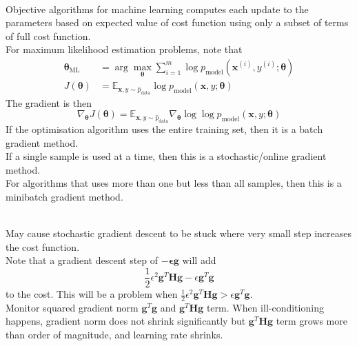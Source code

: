 \begin{remark} \\
Objective algorithms for machine learning computes each update to the parameters based on expected value of cost function using only a subset of terms of full cost function.\\
For maximum likelihood estimation problems, note that
\begin{align}
\bm{\theta}_{\text{ML}} &= \arg \max_{\bm{\theta}} \sum\limits_{i=1}^m \log p_{\text{model}}(\bm{x}^{(i)}, y^{(i)}; \bm{\theta}) \nonumber \\
J(\bm{\theta}) &= \mathbb{E}_{\bm{x}, y \sim \hat{p}_{\text{data}}} \log p_{\text{model}} (\bm{x}, y; \bm{\theta}) \nonumber
\end{align}
The gradient is then
\begin{equation}
\nabla_{\bm{\theta}} J(\bm{\theta}) = \mathbb{E}_{\bm{x}, y \sim \hat{p}_{\text{data}}} \nabla_{\bm{\theta}} \log \log p_{\text{model}} (\bm{x}, y; \bm{\theta}) \nonumber
\end{equation}
If the optimisation algorithm uses the entire training set, then it is a batch gradient method.\\
If a single sample is used at a time, then this is a stochastic/online gradient method.\\
For algorithms that uses more than one but less than all samples, then this is a minibatch gradient method.
\end{remark}

\begin{remark} \\
May cause stochastic gradient descent to be stuck where very small step increases the cost function.\\
Note that a gradient descent step of $- \bm{\epsilon} \bm{g}$ will add
\begin{equation}
\frac{1}{2} \epsilon^2 \bm{g}^T \bm{H} \bm{g} - \epsilon \bm{g}^T \bm{g} \nonumber
\end{equation}
to the cost. This will be a problem when $\frac{1}{2} \epsilon^2 \bm{g}^T \bm{H} \bm{g} > \epsilon \bm{g}^T \bm{g}$.\\
Monitor squared gradient norm $\bm{g}^T \bm{g}$ and $\bm{g}^T \bm{H} \bm{g}$ term. When ill-conditioning happens, gradient norm does not shrink significantly but $\bm{g}^T \bm{H} \bm{g}$ term grows more than order of magnitude, and learning rate shrinks.
\end{remark}

